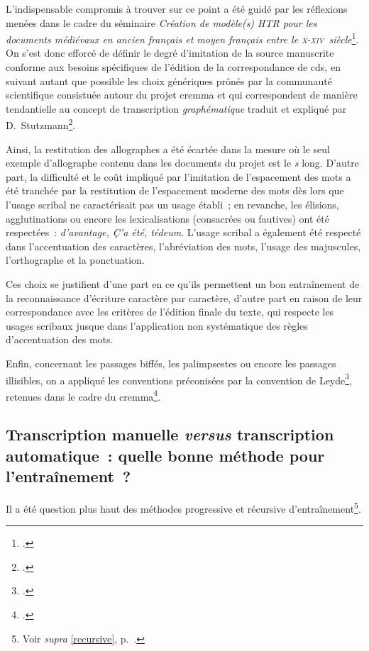 \documentclass[a4paper,12pt,twoside]{book}
\newcommand{\siecle}[1]{\textsc{#1}\ieme}
\begin{document}
				L'indispensable compromis à trouver sur ce point a été guidé par les réflexions menées dans le cadre du séminaire \textit{Création de modèle(s) HTR pour les documents médiévaux en ancien français et moyen français entre le \siecle{x}-\siecle{xiv}~siècle}\footcite{pincheSeminaireCreationModele2021b}. On s'est donc efforcé de définir le degré d'imitation de la source manuscrite conforme aux besoins spécifiques de l'édition de la correspondance de \gls{cds}, en suivant autant que possible les choix génériques prônés par la communauté scientifique consistuée autour du projet \gls{cremma} et qui correspondent de manière tendantielle au concept de transcription \textit{graphématique} traduit et expliqué par D.~Stutzmann\footcite[p.~251]{stutzmannPaleographieStatistiquePour2011a}.
				
				Ainsi, la restitution des allographes a été écartée dans la mesure où le seul exemple d'allographe contenu dans les documents du projet est le \textit{s} long. D'autre part, la difficulté et le coût impliqué par l'imitation de l'espacement des mots a été tranchée par la restitution de l'espacement moderne des mots dès lors que l'usage scribal ne caractérisait pas un usage établi~; en revanche, les élisions, agglutinations ou encore les lexicalisations (consacrées ou fautives) ont été respectées~: \textit{d'avantage, Ç'a été, tédeum}. L'usage scribal a également été respecté dans l'accentuation des caractères, l'abréviation des mots, l'usage des majuscules, l'orthographe et la ponctuation.
				
				Ces choix se justifient d'une part en ce qu'ils permettent un bon entraînement de la reconnaissance d'écriture caractère par caractère, d'autre part en raison de leur correspondance avec les critères de l'édition finale du texte, qui respecte les usages scribaux jusque dans l'application non systématique des règles d'accentuation des mots.
				
				Enfin, concernant les passages biffés, les palimpsestes ou encore les passages illisibles, on a appliqué les conventions préconisées par la convention de Leyde\footcite{leidenConvention}, retenues dans le cadre du \gls{cremma}\footcite{pincheSeminaireCreationModele2021a}.
				
			\subsection{Transcription manuelle \textit{versus} transcription automatique~: quelle bonne méthode pour l'entraînement~?}
				\label{progressive}
				Il a été question plus haut des méthodes progressive et récursive d'entraînement\footnote{Voir \textit{supra} \ref{recursive}, p.~\pageref{recursive}.}.
				
\end{document}
